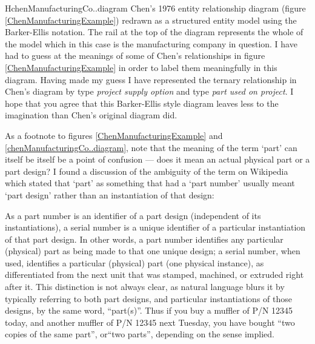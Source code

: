 \begin{erboxedFigure} {H}{chenManufacturingCo..diagram}{
Chen's 1976 entity relationship diagram (figure \ref{ChenManufacturingExample}) 
redrawn as a structured entity model using the Barker-Ellis notation. 
 The rail at the top of the diagram represents the whole of the model which in this case is the manufacturing company in question.
I have had to guess at the meanings of some of Chen's relationships in figure \ref{ChenManufacturingExample}
 in order to label them meaningfully in this diagram. 
Having made my guess I have represented  the ternary relationship in Chen's diagram by type \textit{project supply option} and type \textit{part used on project}. 
I hope that you agree that this Barker-Ellis style diagram leaves less to the imagination than Chen's original diagram did.
}
\scalebox{0.95}{}
\end{erboxedFigure}
As a footnote to figures \ref{ChenManufacturingExample} and \ref{chenManufacturingCo..diagram}, 
note that the  meaning of the term  `part' can itself be itself be a point of confusion ---
does it mean an actual physical part or  a part design?
I found a discussion of the ambiguity of the term  on Wikipedia which stated that `part' as something that had a `part number' usually meant `part design' rather than an instantiation of that design:
\begin{erquote}
As a part number is an identifier of a part design (independent of its instantiations), a serial number is a unique identifier of a particular instantiation of that part design. In other words, a part number identifies any particular (physical) part as being made to that one unique design; a serial number, when used, identifies a particular (physical) part (one physical instance), as differentiated from the next unit that was stamped, machined, or extruded right after it. This distinction is not always clear, as natural language blurs it by typically referring to both part designs, and particular instantiations of those designs, by the same word, ``part(s)''. Thus if you buy a muffler of P/N 12345 today, and another muffler of P/N 12345 next Tuesday, you have bought ``two copies of the same part'', or``two parts'', depending on the sense implied.
\end{erquote}

